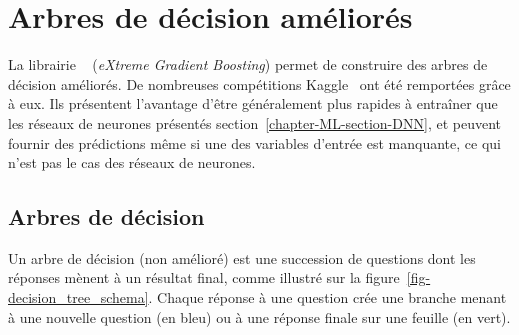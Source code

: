 \section{Arbres de décision améliorés}\label{chapter-ML-section-XGB}
La librairie
\XGBOOST~\cite{xgboost}
(\emph{eXtreme Gradient Boosting})
permet de construire des
arbres de décision améliorés.
De nombreuses compétitions Kaggle~\cite{kaggle_challenge} ont été remportées grâce à eux.
Ils présentent l'avantage d'être généralement plus rapides à entraîner que les réseaux de neurones présentés section~\ref{chapter-ML-section-DNN},
et peuvent fournir des prédictions même si une des variables d'entrée est manquante, ce qui n'est pas le cas des réseaux de neurones.
\subsection{Arbres de décision}\label{chapter-ML-section-XGB-decision_trees}
Un arbre de décision (non amélioré) est une succession de questions
dont les réponses mènent à un résultat final,
comme illustré sur la figure~\ref{fig-decision_tree_schema}.
Chaque réponse à une question crée une \og branche \fg{} menant à une nouvelle question (en bleu)
ou à une réponse finale sur une \og feuille \fg{} (en vert).
